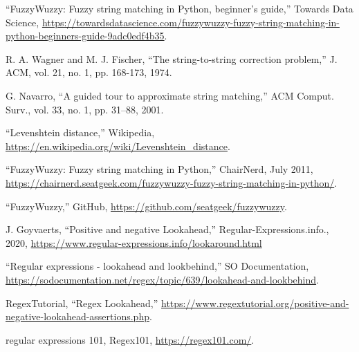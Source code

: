 \documentclass[technicalreport]{ieicej}
\begin{document}
%
%
\begin{thebibliography}{99}%
    “FuzzyWuzzy: Fuzzy string matching in Python, beginner’s guide,” Towards Data Science, 
    \url{https://towardsdatascience.com/fuzzywuzzy-fuzzy-string-matching-in-python-beginners-guide-9adc0edf4b35}.

    R. A. Wagner and M. J. Fischer, “The string-to-string correction problem,” J. ACM, vol. 21, no. 1, pp. 168-173, 1974.

    G. Navarro, “A guided tour to approximate string matching,” ACM Comput. Surv., vol. 33, no. 1, pp. 31–88, 2001.

    “Levenshtein distance,” Wikipedia,
    \url{https://en.wikipedia.org/wiki/Levenshtein_distance}.

    “FuzzyWuzzy: Fuzzy string matching in Python,” ChairNerd, July 2011,
    \url{https://chairnerd.seatgeek.com/fuzzywuzzy-fuzzy-string-matching-in-python/}.

    “FuzzyWuzzy,” GitHub,
    \url{https://github.com/seatgeek/fuzzywuzzy}.

    J. Goyvaerts, “Positive and negative Lookahead,” Regular-Expressions.info., 2020,
    \url{https://www.regular-expressions.info/lookaround.html}

    “Regular expressions - lookahead and lookbehind,” SO Documentation,
    \url{https://sodocumentation.net/regex/topic/639/lookahead-and-lookbehind}.

    RegexTutorial, “Regex Lookahead,”
    \url{https://www.regextutorial.org/positive-and-negative-lookahead-assertions.php}.

    regular expressions 101, Regex101,
    \url{https://regex101.com/}.

\end{thebibliography}
\end{document}
